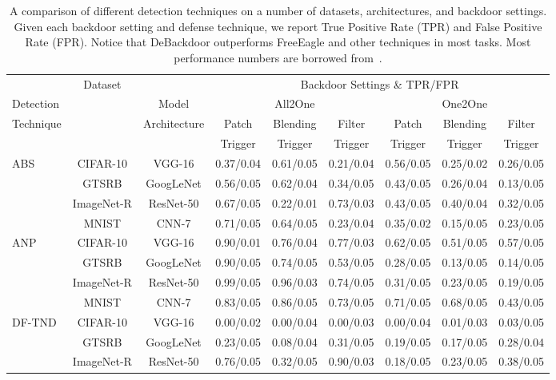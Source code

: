 \documentclass[letterpaper,twocolumn,10pt]{article}
\begin{document}
\begin{table}[t]
\small
\setlength{\tabcolsep}{4pt}
\caption{A comparison of different detection techniques on a number of datasets, architectures, and backdoor settings. Given each backdoor setting and defense technique, we report True Positive Rate (TPR) and False Positive Rate (FPR). Notice that DeBackdoor outperforms FreeEagle and other techniques in most tasks. Most performance numbers are borrowed from~\cite{fu2023eagle}.}
\label{tab:white-box}
\centering
\begin{tabular}{l c c c c c c c c}
\toprule
 & \multirow{4}{*}{Dataset} & & \multicolumn{6}{c}{Backdoor Settings \& TPR/FPR} \\
\cline{4-9}
Detection & & Model & \multicolumn{3}{c}{All2One} & \multicolumn{3}{c}{One2One} \\
\cline{4-9}
Technique & & Architecture & Patch & Blending & Filter & Patch & Blending & Filter\\
 & & & Trigger & Trigger & Trigger & Trigger & Trigger & Trigger\\
 \midrule
 \multirow{4}{*}{ABS} 
 & CIFAR-10 & VGG-16 & 0.37/0.04 & 0.61/0.05 & 0.21/0.04 & 0.56/0.05 & 0.25/0.02 & 0.26/0.05\\
 & GTSRB & GoogLeNet & 0.56/0.05 & 0.62/0.04 & 0.34/0.05 & 0.43/0.05 & 0.26/0.04 & 0.13/0.05\\
 & ImageNet-R & ResNet-50 & 0.67/0.05 & 0.22/0.01 & 0.73/0.03 & 0.43/0.05 & 0.40/0.04 & 0.32/0.05\\
 & MNIST & CNN-7 & 0.71/0.05 & 0.64/0.05 & 0.23/0.04 & 0.35/0.02 & 0.15/0.05 & 0.23/0.05\\
\midrule
\multirow{4}{*}{ANP} 
 & CIFAR-10 & VGG-16 & 0.90/0.01 & 0.76/0.04 & 0.77/0.03 & 0.62/0.05 & 0.51/0.05 & 0.57/0.05\\
 & GTSRB & GoogLeNet & 0.90/0.05 & 0.74/0.05 & 0.53/0.05 & 0.28/0.05 & 0.13/0.05 & 0.14/0.05\\
 & ImageNet-R & ResNet-50 & 0.99/0.05 & 0.96/0.03 & 0.74/0.05 & 0.31/0.05 & 0.23/0.05 & 0.19/0.05\\
 & MNIST & CNN-7 & 0.83/0.05 & 0.86/0.05 & 0.73/0.05 & 0.71/0.05 & 0.68/0.05 & 0.43/0.05\\
\midrule
\multirow{4}{*}{DF-TND} 
 & CIFAR-10 & VGG-16 & 0.00/0.02 & 0.00/0.04 & 0.00/0.03 & 0.00/0.04 & 0.01/0.03 & 0.03/0.05\\
 & GTSRB & GoogLeNet & 0.23/0.05 & 0.08/0.04 & 0.31/0.05 & 0.19/0.05 & 0.17/0.05 & 0.28/0.04\\
 & ImageNet-R & ResNet-50 & 0.76/0.05 & 0.32/0.05 & 0.90/0.03 & 0.18/0.05 & 0.23/0.05 & 0.38/0.05\\

\end{tabular}
\end{table}
\end{document}
